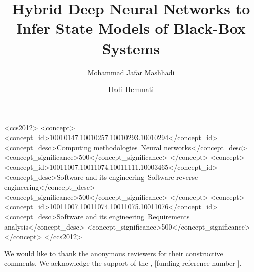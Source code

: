 \documentclass[sigconf, review, anonymous]{acmart}
\begin{document}
\title{Hybrid Deep Neural Networks to Infer State Models of Black-Box Systems}

\author{Mohammad Jafar Mashhadi}

\author{Hadi Hemmati}


\begin{CCSXML}
<ccs2012>
   <concept>
       <concept_id>10010147.10010257.10010293.10010294</concept_id>
       <concept_desc>Computing methodologies~Neural networks</concept_desc>
       <concept_significance>500</concept_significance>
       </concept>
   <concept>
       <concept_id>10011007.10011074.10011111.10003465</concept_id>
       <concept_desc>Software and its engineering~Software reverse engineering</concept_desc>
       <concept_significance>500</concept_significance>
       </concept>
   <concept>
       <concept_id>10011007.10011074.10011075.10011076</concept_id>
       <concept_desc>Software and its engineering~Requirements analysis</concept_desc>
       <concept_significance>500</concept_significance>
       </concept>
 </ccs2012>
\end{CCSXML}





\maketitle








\begin{acks}
We would like to thank the anonymous reviewers for their constructive comments.
We acknowledge the support of the , [funding reference number ].
\end{acks}



\end{document}
